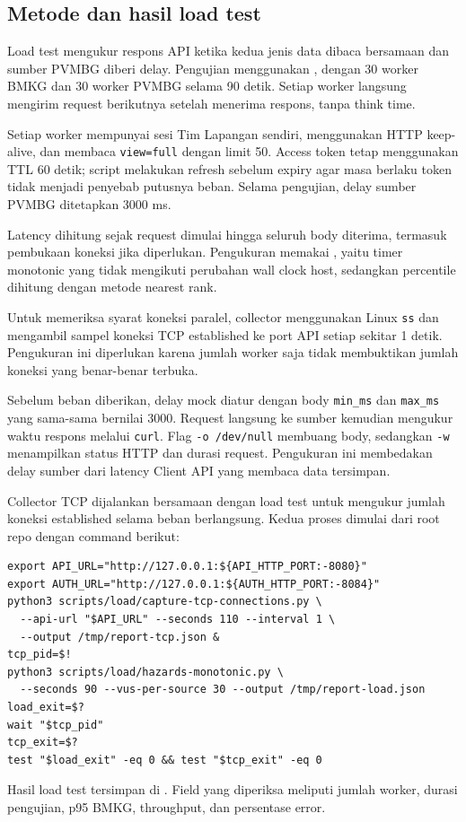 \subsection{Metode dan hasil load test}
\label{sec:p2-load}
Load test mengukur respons API ketika kedua jenis data dibaca bersamaan dan sumber PVMBG diberi delay. Pengujian menggunakan , dengan 30 worker BMKG dan 30 worker PVMBG selama 90 detik. Setiap worker langsung mengirim request berikutnya setelah menerima respons, tanpa think time.

Setiap worker mempunyai sesi Tim Lapangan sendiri, menggunakan HTTP keep-alive, dan membaca \texttt{view=full} dengan limit 50. Access token tetap menggunakan TTL 60 detik; script melakukan refresh sebelum expiry agar masa berlaku token tidak menjadi penyebab putusnya beban. Selama pengujian, delay sumber PVMBG ditetapkan 3000 ms.

Latency dihitung sejak request dimulai hingga seluruh body diterima, termasuk pembukaan koneksi jika diperlukan. Pengukuran memakai , yaitu timer monotonic yang tidak mengikuti perubahan wall clock host, sedangkan percentile dihitung dengan metode nearest rank.

Untuk memeriksa syarat koneksi paralel, collector menggunakan Linux \texttt{ss} dan mengambil sampel koneksi TCP established ke port API setiap sekitar 1 detik. Pengukuran ini diperlukan karena jumlah worker saja tidak membuktikan jumlah koneksi yang benar-benar terbuka.

Sebelum beban diberikan, delay mock diatur dengan body \texttt{min\_ms} dan \texttt{max\_ms} yang sama-sama bernilai 3000. Request langsung ke sumber kemudian mengukur waktu respons melalui \texttt{curl}. Flag \texttt{-o /dev/null} membuang body, sedangkan \texttt{-w} menampilkan status HTTP dan durasi request. Pengukuran ini membedakan delay sumber dari latency Client API yang membaca data tersimpan.

Collector TCP dijalankan bersamaan dengan load test untuk mengukur jumlah koneksi established selama beban berlangsung. Kedua proses dimulai dari root repo dengan command berikut:
\begin{lstlisting}
export API_URL="http://127.0.0.1:${API_HTTP_PORT:-8080}"
export AUTH_URL="http://127.0.0.1:${AUTH_HTTP_PORT:-8084}"
python3 scripts/load/capture-tcp-connections.py \
  --api-url "$API_URL" --seconds 110 --interval 1 \
  --output /tmp/report-tcp.json &
tcp_pid=$!
python3 scripts/load/hazards-monotonic.py \
  --seconds 90 --vus-per-source 30 --output /tmp/report-load.json
load_exit=$?
wait "$tcp_pid"
tcp_exit=$?
test "$load_exit" -eq 0 && test "$tcp_exit" -eq 0
\end{lstlisting}
Hasil load test tersimpan di . Field yang diperiksa meliputi jumlah worker, durasi pengujian, p95 BMKG, throughput, dan persentase error.

